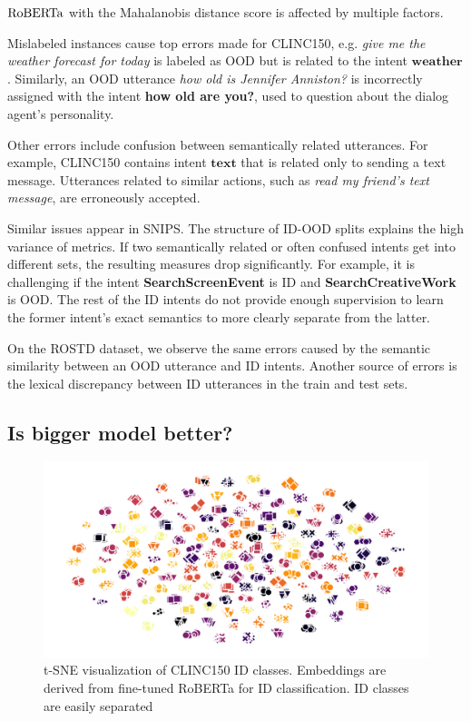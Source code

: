 \documentclass[letterpaper, final]{article} %
\begin{document}
$\rm{RoBERTa}$ with the Mahalanobis distance score is affected by multiple factors.

Mislabeled instances cause top errors made for CLINC150, e.g. {\it give me the weather forecast for today} is labeled as OOD but is related to the intent $\mathbf{weather}$. Similarly, an OOD utterance {\it how old is Jennifer Anniston?}  is incorrectly assigned with the intent {\bf how old are you?}, used to question about the dialog agent's personality.


Other errors include confusion between semantically related utterances.  For example, CLINC150 contains intent $\mathbf{text}$ that is related only to sending a text message. Utterances related to similar actions, such as {\it read my friend's text message}, are erroneously accepted.


Similar issues appear in SNIPS. The structure of ID-OOD  splits explains the high variance of metrics. If two semantically related or often confused intents get into different sets, the resulting measures drop significantly. For example, it is  challenging  if the intent {\bf SearchScreenEvent} is ID and {\bf SearchCreativeWork} is OOD. The rest of the ID intents do not provide enough supervision to learn the former intent's exact semantics to more clearly separate from the latter. 

On the ROSTD dataset, we observe the same errors caused by the semantic similarity between an OOD utterance and ID intents. Another source of errors is the lexical discrepancy between ID utterances in the train and test sets.



\subsection{Is bigger model better?}

%
\begin{figure}[t]
  \includegraphics[width=\columnwidth]{roberta_train_features_tsne.png}
  \caption{t-SNE visualization of CLINC150 ID classes. Embeddings are derived from fine-tuned RoBERTa for ID classification. ID classes are easily separated}
  \label{fig:tsne}
\end{figure}
\end{document}
